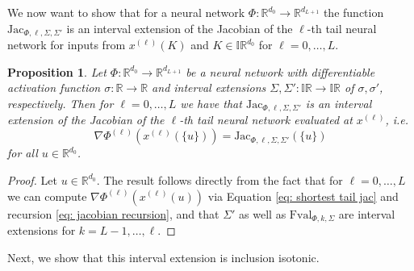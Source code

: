 \documentclass[a4paper, 11pt]{article}
\newtheorem{proposition}[theorem]{Proposition}
\begin{document}
	We now want to show that for a neural network $\Phi : \mathbb{R}^{d_0} \to \mathbb{R}^{d_{L+1}}$ the function $\mathrm{Jac}_{\Phi,\ell, \Sigma, \Sigma'}$ is an interval extension of the Jacobian of the $\ell$-th tail neural network for inputs from $x^{(\ell)}(K)$ and $K \in \mathbb{IR}^{d_0}$ for $\ell = 0, \dotsc, L$.
	
	
	\begin{proposition}\label{prop: jac interval extension}
		Let $\Phi : \mathbb{R}^{d_0} \to \mathbb{R}^{d_{L+1}}$ be a neural network with differentiable activation function $\sigma : \mathbb{R} \to \mathbb{R}$ and interval extensions $\Sigma,\Sigma':\mathbb{IR}\to \mathbb{IR}$ of $\sigma,\sigma'$, respectively. Then for $\ell=0,\dotsc, L$ we have that $\mathrm{Jac}_{\Phi,\ell, \Sigma, \Sigma'}$ is {an} interval extension {of} the Jacobian of {the} $\ell$-th tail neural network evaluated at $x^{(\ell)}$, i.e.
		$$ \nabla \Phi^{(\ell)}(x^{(\ell)}(\{u\})) = \mathrm{Jac}_{\Phi,\ell, \Sigma, \Sigma'}(\{u\}) $$
		for all $u\in \mathbb{R}^{d_0}$.
	\end{proposition}
	
	\begin{proof}
		Let $u \in \mathbb{R}^{d_0}$. The result follows directly from the fact that for $\ell=0, \dotsc, L$ we can compute $\nabla \Phi^{(\ell)}(x^{(\ell)}(u))$ via Equation \eqref{eq: shortest tail jac} and recursion \eqref{eq: jacobian recursion}{, and that} $\Sigma'$ as well as $\mathrm{Fval}_{\Phi,k,\Sigma}$ are interval extensions for $k=L-1, \dotsc, \ell$.
	\end{proof}
	
	
	
	Next, we show that this interval extension is inclusion isotonic.
	
\end{document}
